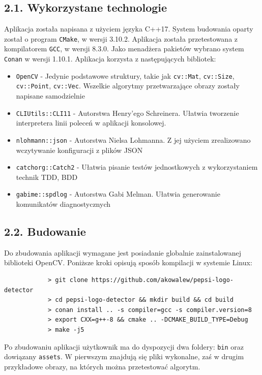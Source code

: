 \documentclass[11pt,a4paper,twoside]{report}
\begin{document}
	\subsection*{2.1. Wykorzystane technologie}

		Aplikacja została napisana z użyciem języka C++17. System budowania oparty został o program \texttt{CMake}, w wersji 3.10.2. Aplikacja została przetestowana z kompilatorem \texttt{GCC}, w wersji 8.3.0. Jako menadżera pakietów wybrano system \texttt{Conan} w wersji 1.10.1. Aplikacja korzysta z następujących bibliotek:
		\begin{itemize}
			\item \texttt{OpenCV} - Jedynie podstawowe struktury, takie jak \texttt{cv::Mat}, \texttt{cv::Size}, \texttt{cv::Point}, \texttt{cv::Vec}. Wszelkie algorytmy przetwarzające obrazy zostały napisane samodzielnie
			\item \texttt{CLIUtils::CLI11} - Autorstwa Henry'ego Schreinera. Ułatwia tworzenie interpretera linii poleceń w aplikacji konsolowej.
			\item \texttt{nlohmann::json} - Autorstwa Nielsa Lohmanna. Z jej użyciem zrealizowano wczytywanie konfiguracji z plików JSON
			\item \texttt{catchorg::Catch2} - Ułatwia pisanie testów jednostkowych z wykorzystaniem technik TDD, BDD
			\item \texttt{gabime::spdlog} - Autorstwa Gabi Melman. Ułatwia generowanie komunikatów diagnostycznych
		\end{itemize}

	\subsection*{2.2. Budowanie}

		Do zbudowania aplikacji wymagane jest posiadanie globalnie zainstalowanej biblioteki OpenCV. Poniższe kroki opisują sposób kompilacji w systemie Linux:
		\begin{verbatim}
		    > git clone https://github.com/akowalew/pepsi-logo-detector
		    > cd pepsi-logo-detector && mkdir build && cd build
		    > conan install .. -s compiler=gcc -s compiler.version=8
		    > export CXX=g++-8 && cmake .. -DCMAKE_BUILD_TYPE=Debug
		    > make -j5
		\end{verbatim}

		Po zbudowaniu aplikacji użytkownik ma do dyspozycji dwa foldery: \texttt{bin} oraz dowiązany \texttt{assets}. W pierwszym znajdują się pliki wykonalne, zaś w drugim przykładowe obrazy, na których można przetestować algorytm.
\end{document}
